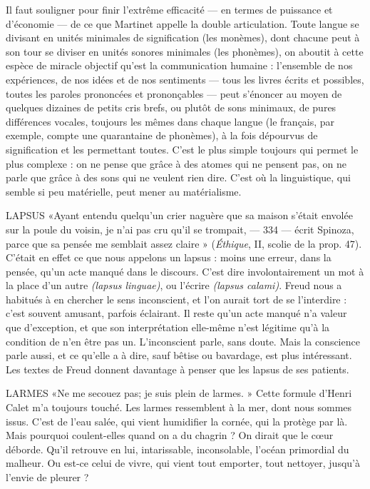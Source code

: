 {Il faut souligner pour finir l’extrême efficacité — en termes de puissance et
d'économie — de ce que Martinet appelle la double articulation. Toute langue
se divisant en unités minimales de signification (les monèmes), dont chacune
peut à son tour se diviser en unités sonores minimales (les phonèmes), on
aboutit à cette espèce de miracle objectif qu’est la communication humaine :
l’ensemble de nos expériences, de nos idées et de nos sentiments — tous les livres
écrits et possibles, toutes les paroles prononcées et prononçables — peut
s’énoncer au moyen de quelques dizaines de petits cris brefs, ou plutôt de sons
minimaux, de pures différences vocales, toujours les mêmes dans chaque langue
(le français, par exemple, compte une quarantaine de phonèmes), à la fois
dépourvus de signification et les permettant toutes. C’est le plus simple toujours
qui permet le plus complexe : on ne pense que grâce à des atomes qui ne
pensent pas, on ne parle que grâce à des sons qui ne veulent rien dire. C’est où
la linguistique, qui semble si peu matérielle, peut mener au matérialisme.

LAPSUS «Ayant entendu quelqu'un crier naguère que sa maison s'était
envolée sur la poule du voisin, je n’ai pas cru qu’il se trompait,
— 334 —
écrit Spinoza, parce que sa pensée me semblait assez claire » ({\it Éthique}, II, scolie
de la prop. 47). C'était en effet ce que nous appelons un lapsus : moins une
erreur, dans la pensée, qu’un acte manqué dans le discours. C’est dire involontairement
un mot à la place d’un autre {\it (lapsus linguae)}, ou l'écrire {\it (lapsus
calami)}. Freud nous a habitués à en chercher le sens inconscient, et l’on aurait
tort de se l’interdire : c’est souvent amusant, parfois éclairant. Il reste qu’un
acte manqué n’a valeur que d’exception, et que son interprétation elle-même
n'est légitime qu’à la condition de n’en être pas un. L’inconscient parle, sans
doute. Mais la conscience parle aussi, et ce qu’elle a à dire, sauf bêtise ou bavardage,
est plus intéressant. Les textes de Freud donnent davantage à penser que
les lapsus de ses patients.

LARMES «Ne me secouez pas; je suis plein de larmes. » Cette formule
d'Henri Calet m'a toujours touché. Les larmes ressemblent à la
mer, dont nous sommes issus. C’est de l’eau salée, qui vient humidifier la
cornée, qui la protège par là. Mais pourquoi coulent-elles quand on a du
chagrin ? On dirait que le cœur déborde. Qu'il retrouve en lui, intarissable,
inconsolable, l'océan primordial du malheur. Ou est-ce celui de vivre, qui vient
tout emporter, tout nettoyer, jusqu’à l’envie de pleurer ?

}
